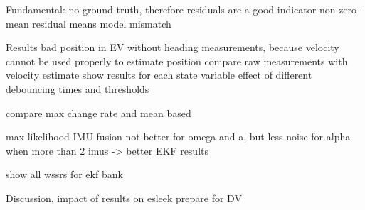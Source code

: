 Fundamental: no ground truth, therefore residuals are a good indicator
non-zero-mean residual means model mismatch~\cite[p.~158]{AlexanderWischnewski.2019}

Results
bad position in EV without heading measurements, because velocity cannot be used properly to estimate position
compare raw measurements with velocity estimate
show results for each state variable
effect of different debouncing times and thresholds

compare max change rate and mean based

max likelihood IMU fusion not better for omega and a, but less noise for alpha when more than 2 imus -> better EKF results

show all wssrs for ekf bank


Discussion, impact of results on esleek
prepare for DV

